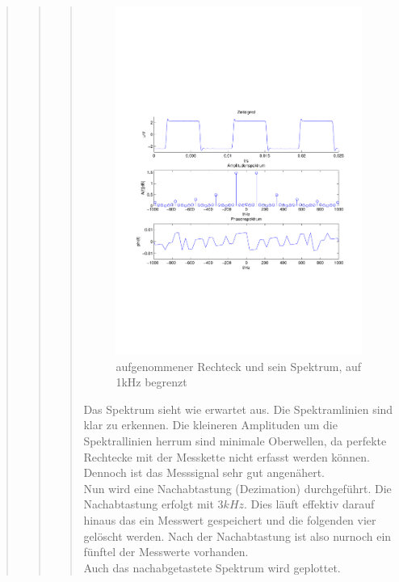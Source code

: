 \begin{quote}
\begin{quote}
\begin{quote}
            \begin{figure}[H]
            \centering
                \includegraphics[scale=0.7, trim = 1.5cm 6.5cm 1cm 7.5cm,
                clip]{./Bilder/rechteck_100Hz_15kHz_frequenzbegrenzung.pdf}
                   \caption{aufgenommener Rechteck und sein Spektrum, auf 1kHz begrenzt}
            \end{figure}
    
        
            Das Spektrum sieht wie erwartet aus. Die Spektramlinien sind klar zu erkennen. Die kleineren
            Amplituden um die Spektrallinien herrum sind minimale Oberwellen, da perfekte Rechtecke mit der
            Messkette nicht erfasst werden können. Dennoch ist das Messsignal sehr gut angenähert.\\
            Nun wird eine Nachabtastung (Dezimation) durchgeführt. Die Nachabtastung erfolgt mit $3kHz$. Dies
            läuft effektiv darauf hinaus das ein Messwert gespeichert und die folgenden vier gelöscht werden.
            Nach der Nachabtastung ist also nurnoch ein fünftel der Messwerte vorhanden.\\
            Auch das nachabgetastete Spektrum wird geplottet.
            

\end{quote}
\end{quote}
\end{quote}
